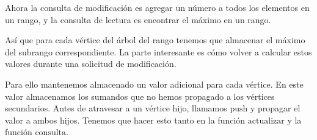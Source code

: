 Ahora la consulta de modificación es agregar un número a todos los elementos en un rango, y la consulta de lectura es encontrar el máximo en un rango.

Así que para cada vértice del árbol del rango tenemos que almacenar el máximo del subrango correspondiente. La parte interesante es cómo volver a calcular estos valores durante una solicitud de modificación.

Para ello mantenemos almacenado un valor adicional para cada vértice. En este valor almacenamos los 
sumandos que no hemos propagado a los vértices secundarios. Antes de atravesar a un vértice hijo, 
llamamos $\text{push}$ y propagar el valor a ambos hijos. Tenemos que hacer esto tanto en la función 
$\text{actualizar}$ y la función $\text{consulta}$.

